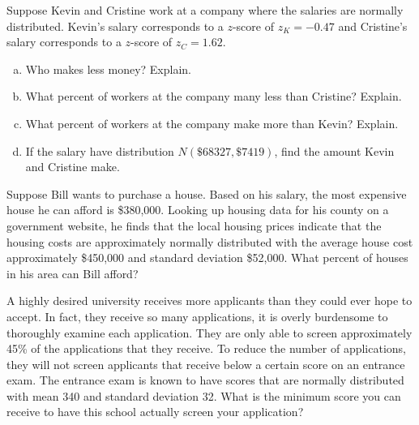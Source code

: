 \documentclass[11pt,letterpaper]{article}
\begin{document}

 Suppose Kevin and Cristine work at a company where the salaries are normally distributed. Kevin's salary corresponds to a $z$-score of $z_K= -0.47$ and Cristine's salary corresponds to a $z$-score of $z_C= 1.62$. 
	\begin{enumerate}[(a)]
	\item Who makes less money? Explain.
	\item What percent of workers at the company many less than Cristine? Explain.
	\item What percent of workers at the company make more than Kevin? Explain.
	\item If the salary have distribution $N(\$68327, \$7419)$, find the amount Kevin and Cristine make. 
	\end{enumerate}



\newpage



 Suppose Bill wants to purchase a house. Based on his salary, the most expensive house he can afford is \$380,000. Looking up housing data for his county on a government website, he finds that the local housing prices indicate that the housing costs are approximately normally distributed with the average house cost approximately \$450,000 and standard deviation \$52,000. What percent of houses in his area can Bill afford? 



\newpage



 A highly desired university receives more applicants than they could ever hope to accept. In fact, they receive so many applications, it is overly burdensome to thoroughly examine each application. They are only able to screen approximately 45\% of the applications that they receive. To reduce the number of applications, they will not screen applicants that receive below a certain score on an entrance exam. The entrance exam is known to have scores that are normally distributed with mean 340 and standard deviation 32. What is the minimum score you can receive to have this school actually screen your application? 
\end{document}
